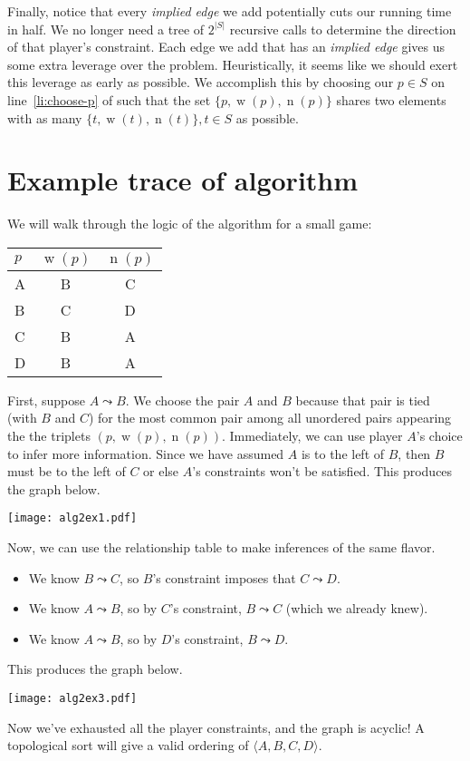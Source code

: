 \documentclass[12pt]{article}
\DeclareMathOperator{\w}{w}
\DeclareMathOperator{\n}{n}
\begin{document}
    Finally, notice that every \emph{implied edge} we add potentially cuts our running time in half. We no longer need a tree of $2^{\lvert S \rvert}$ recursive calls to determine the direction of that player's constraint. Each edge we add that has an \emph{implied edge} gives us some extra leverage over the problem. Heuristically, it seems like we should exert this leverage as early as possible. We accomplish this by choosing our $p\in S$ on line~\ref{li:choose-p} of  such that the set $\{p,\w(p), \n(p)\}$ shares two elements with as many $\{t, \w(t), \n(t)\}, t\in S$ as possible.

\section{Example trace of algorithm}
    We will walk through the logic of the algorithm for a small game:

    \begin{center}
        \begin{tabular}{ l | c | c}
         $p$ & $\w(p)$ & $\n(p)$ \\
         \hline
          A &  B& C\\
          B &  C& D\\
          C &  B& A\\
          D &  B& A\\
        \end{tabular}
    \end{center}

    First, suppose $A \leadsto B$. We choose the pair $A$ and $B$ because that pair is tied (with $B$ and $C$) for the most common pair among all unordered pairs appearing the the triplets $(p, \w(p), \n(p))$. Immediately, we can use player $A$'s choice to infer more information. Since we have assumed $A$ is to the left of $B$, then $B$ must be to the left of $C$ or else $A$'s constraints won't be satisfied. This produces the graph below.
    \begin{center}
    \texttt{[image: alg2ex1.pdf]}
    \end{center}
    Now, we can use the relationship table to make inferences of the same flavor. 
    \begin{itemize}
        \item We know $B \leadsto C$, so $B$'s constraint imposes that $C \leadsto D$.
        \item We know $A \leadsto B$, so by $C$'s constraint, $B \leadsto C$ (which we already knew).
        \item We know $A \leadsto B$, so by $D$'s constraint, $B \leadsto D$.
    \end{itemize}
    This produces the graph below.
    \begin{center}
    \texttt{[image: alg2ex3.pdf]}
    \end{center}
    Now we've exhausted all the player constraints, and the graph is acyclic! A topological sort will give a valid ordering of $\langle A, B, C, D \rangle$.
\end{document}
